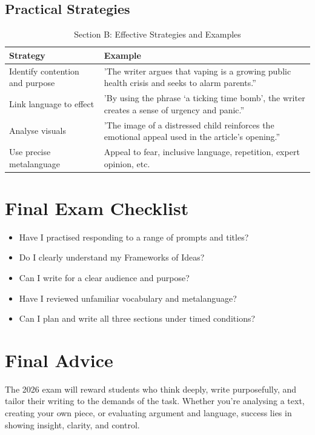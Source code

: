 \documentclass[a4paper]{article}
\begin{document}
\subsection{Practical Strategies}
\begin{table}[ht]
\centering
\begin{tabular}{|l|l|}
\hline
\textbf{Strategy}                    & \textbf{Example}                                                                                      \\ \hline
Identify contention and purpose       & 'The writer argues that vaping is a growing public health crisis and seeks to alarm parents.”          \\ \hline
Link language to effect               & 'By using the phrase ‘a ticking time bomb’, the writer creates a sense of urgency and panic.”          \\ \hline
Analyse visuals                       & 'The image of a distressed child reinforces the emotional appeal used in the article’s opening.”       \\ \hline
Use precise metalanguage              & Appeal to fear, inclusive language, repetition, expert opinion, etc.                                   \\ \hline
\end{tabular}
\caption{Section B: Effective Strategies and Examples}
\end{table}


\newpage
\section{Final Exam Checklist}
\begin{itemize}
    \item Have I practised responding to a range of prompts and titles?

\item Do I clearly understand my Frameworks of Ideas?

\item Can I write for a clear audience and purpose?

\item Have I reviewed unfamiliar vocabulary and metalanguage?

\item Can I plan and write all three sections under timed conditions?
\end{itemize}

\section{Final Advice}
The 2026 exam will reward students who think deeply, write purposefully, and tailor their writing to the demands of the task. Whether you’re analysing a text, creating your own piece, or evaluating argument and language, success lies in showing insight, clarity, and control.\\
\end{document}
